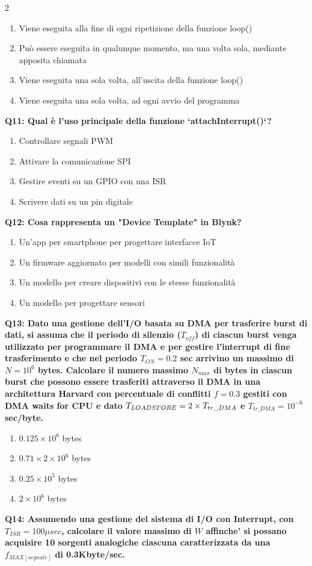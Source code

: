 \documentclass[10pt]{article}
\begin{document}
\begin{multicols}{2}
\begin{enumerate}[label=\arabic*.]
\item Viene eseguita alla fine di ogni ripetizione della funzione loop()
\item Può essere eseguita in qualunque momento, ma una volta sola, mediante apposita chiamata
\item Viene eseguita una sola volta, all'uscita della funzione loop()
\item Viene eseguita una sola volta, ad ogni avvio del programma
\end{enumerate}
\textbf{Q11: Qual è l’uso principale della funzione `attachInterrupt()`?}

\begin{enumerate}[label=\arabic*.]
\item Controllare segnali PWM
\item Attivare la comunicazione SPI
\item Gestire eventi su un GPIO con una ISR
\item Scrivere dati su un pin digitale
\end{enumerate}
\textbf{Q12: Cosa rappresenta un "Device Template" in Blynk?}

\begin{enumerate}[label=\arabic*.]
\item Un'app per smartphone per progettare interfacce IoT
\item Un firmware aggiornato per modelli con simili funzionalità
\item Un modello per creare dispositivi con le stesse funzionalità
\item Un modello per progettare sensori
\end{enumerate}
\textbf{Q13: Dato una gestione dell’I/O basata su DMA per trasferire burst di dati, si assuma che il periodo di silenzio  ($T_{off}$) di ciascun burst venga utilizzato per programmare il DMA e per gestire l’interrupt di fine trasferimento e che nel periodo $T_{ON} = 0.2$ sec arrivino un massimo di $N=10^6$ bytes. Calcolare il numero massimo $N_{max}$ di bytes in ciascun burst che possono essere trasferiti attraverso il DMA in una architettura Harvard con percentuale di conflitti $f = 0.3$ gestiti con DMA waits for CPU e dato $T_{LOAD\/STORE} = 2 \times T_{tr\_DMA}$ e $T_{tr\_DMA} = 10^{-6}$ sec/byte.}

\begin{enumerate}[label=\arabic*.]
\item $0.125 \times 10^6$ bytes
\item $0.71 \times 2 \times 10^6$ bytes
\item $0.25 \times 10^5$ bytes
\item $2 \times 10^6$ bytes
\end{enumerate}
\textbf{Q14: Assumendo una gestione del sistema di I/O con Interrupt, con $T_{ISR}=100\mu sec$, calcolare il valore massimo di $W$ affinche' si possano acquisire 10 sorgenti analogiche ciascuna caratterizzata da una $f_{MAX[segnale]}$ di 0.3Kbyte/sec.}


\end{multicols}
\end{document}
